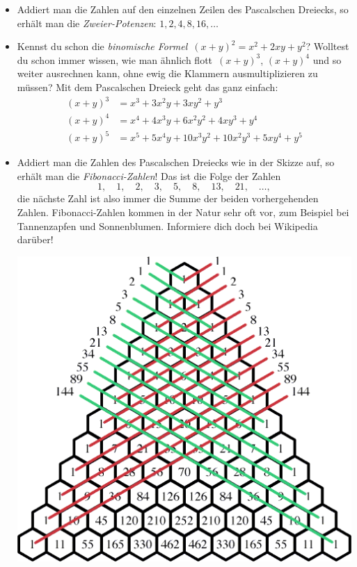 \documentclass[a4paper,ngerman]{scrartcl}
\begin{document}
\begin{itemize}
\item Addiert man die Zahlen auf den einzelnen Zeilen des Pascalschen Dreiecks,
so erhält man die \emph{Zweier-Potenzen}: $1, 2, 4, 8, 16, \ldots$

\item Kennst du schon die \emph{binomische Formel}~$(x+y)^2 = x^2 + 2xy + y^2$?
Wolltest du schon immer wissen, wie man ähnlich flott~$(x+y)^3$, $(x+y)^4$ und
so weiter ausrechnen kann, ohne ewig die Klammern ausmultiplizieren zu müssen?
Mit dem Pascalschen Dreieck geht das ganz einfach:
\begin{align*}
  (x+y)^3 &= x^3 + 3x^2y + 3xy^2 + y^3 \\
  (x+y)^4 &= x^4 + 4x^3y + 6x^2y^2 + 4xy^3 + y^4 \\
  (x+y)^5 &= x^5 + 5x^4y + 10x^3y^2 + 10x^2y^3 + 5xy^4 + y^5
\end{align*}

\item Addiert man die Zahlen des Pascalschen Dreiecks wie in der Skizze auf, so
erhält man die \emph{Fibonacci-Zahlen}! Das ist die Folge der Zahlen
\[ 1, \quad 1, \quad 2, \quad 3, \quad 5, \quad 8, \quad 13, \quad 21, \quad
\ldots, \]
die nächste Zahl ist also immer die Summe der beiden vorhergehenden Zahlen.
Fibonacci-Zahlen kommen in der Natur sehr oft vor, zum Beispiel bei
Tannenzapfen und Sonnenblumen. Informiere dich doch bei Wikipedia darüber!

\begin{center}
\includegraphics[scale=0.9]{pascal-fibonacci}
\end{center}
\end{itemize}
\end{document}
